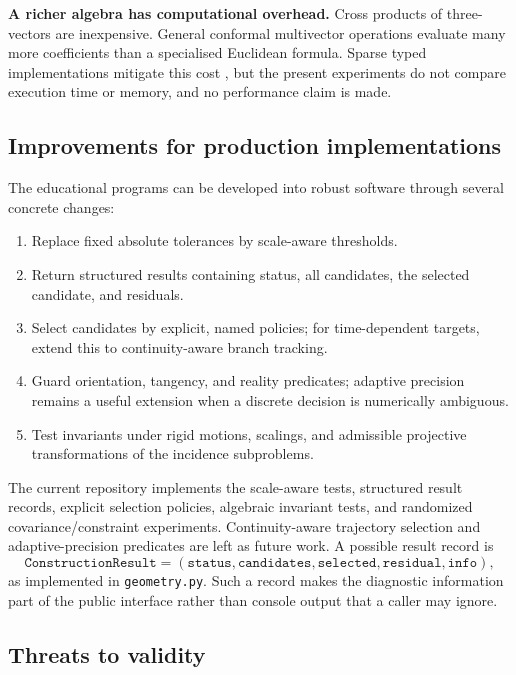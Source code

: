 \documentclass[11pt,a4paper]{article}
\theoremstyle{plain}
\theoremstyle{definition}
\theoremstyle{remark}
\begin{document}
\textbf{A richer algebra has computational overhead.} Cross products of
three-vectors are inexpensive. General conformal multivector operations evaluate
many more coefficients than a specialised Euclidean formula. Sparse typed
implementations mitigate this cost \citep{hildenbrand2013,low2023}, but the
present experiments do not compare execution time or memory, and no performance
claim is made.

\subsection{Improvements for production implementations}

The educational programs can be developed into robust software through several
concrete changes:
\begin{enumerate}
  \item Replace fixed absolute tolerances by scale-aware thresholds.
  \item Return structured results containing status, all candidates, the
        selected candidate, and residuals.
  \item Select candidates by explicit, named policies; for time-dependent
        targets, extend this to continuity-aware branch tracking.
  \item Guard orientation, tangency, and reality predicates; adaptive
        precision remains a useful extension when a discrete decision is
        numerically ambiguous.
  \item Test invariants under rigid motions, scalings, and admissible
        projective transformations of the incidence subproblems.
\end{enumerate}
The current repository implements the scale-aware tests, structured result
records, explicit selection policies, algebraic invariant tests, and randomized
covariance/constraint experiments. Continuity-aware trajectory selection and
adaptive-precision predicates are left as future work.
A possible result record is
\begin{equation}
  \texttt{ConstructionResult}
  = (\texttt{status},\texttt{candidates},\texttt{selected},
     \texttt{residual},\texttt{info}),
\end{equation}
as implemented in \texttt{geometry.py}. Such a record makes the diagnostic
information part of the public interface rather than console output that a
caller may ignore.

\subsection{Threats to validity}
\end{document}
